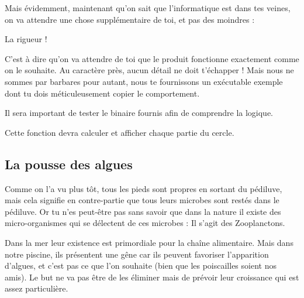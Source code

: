 \documentclass[a4paper, 12pt]{article}
\begin{document}
{    

    Mais évidemment, maintenant qu'on sait que l'informatique est dans tes veines, on va attendre
    une chose supplémentaire de toi, et pas des moindres :
    \newline \newline
    \begin{center}
        {\huge La rigueur !}
    \end{center}
    \vspace{1cm}
    
    C'est à dire qu'on va attendre de toi que le produit fonctionne exactement comme on le souhaite.
    Au caractère près, aucun détail ne doit t'échapper !
    \newline \newline
    Mais nous ne sommes par barbares pour autant, nous te fournissons un exécutable exemple dont tu dois
    méticuleusement copier le comportement.



    Il sera important de tester le binaire fournis afin de comprendre la logique.

    Cette fonction devra calculer et afficher chaque partie du cercle.
    
    \vspace{2cm}

    \subsection{La pousse des algues}

    Comme on l'a vu plus tôt, tous les pieds sont propres en sortant du pédiluve, mais cela signifie en contre-partie
    que tous leurs microbes sont restés dans le pédiluve. Or tu n'es peut-être pas sans savoir que dans la nature
    il existe des micro-organismes qui se délectent de ces microbes : Il s'agit des Zooplanctons.
    \newline \newline


    Dans la mer leur existence est primordiale pour la chaîne alimentaire. Mais dans notre piscine, ils présentent une gêne
    car ils peuvent favoriser l'apparition d'algues, et c'est pas ce que l'on souhaite (bien que les poiscailles soient nos amis).
    Le but ne va pas être de les éliminer mais de prévoir leur croissance qui est assez particulière.
    \newline\newline

}
\end{document}

